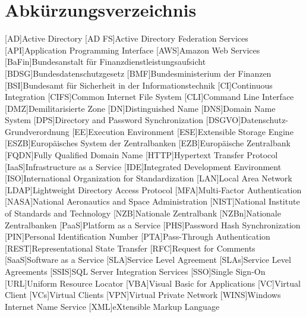 
\chapter{Abkürzungsverzeichnis}
\begin{acronym}[WHATWG ]
\setlength{\itemsep}{-\parsep}
[AD]{Active Directory}
[AD FS]{Active Directory Federation Services}
[API]{Application Programming Interface}
[AWS]{Amazon Web Services}
[BaFin]{Bundesanstalt für Finanzdienstleistungsaufsicht}
[BDSG]{Bundesdatenschutzgesetz}
[BMF]{Bundesministerium der Finanzen}
[BSI]{Bundesamt für Sicherheit in der Informationstechnik}
[CI]{Continuous Integration}
[CIFS]{Common Internet File System}
[CLI]{Command Line Interface}
[DMZ]{Demilitarisierte Zone}
[DN]{Distinguished Name}
[DNS]{Domain Name System}
[DPS]{Directory and Password Synchronization}
[DSGVO]{Datenschutz-Grundverordnung}
[EE]{Execution Environment}
[ESE]{Extensible Storage Engine}
[ESZB]{Europäisches System der Zentralbanken}
[EZB]{Europäische Zentralbank}
[FQDN]{Fully Qualified Domain Name}
[HTTP]{Hypertext Transfer Protocol}
[IaaS]{Infrastructure as a Service}
[IDE]{Integrated Development Environment}
[ISO]{International Organization for Standardization}
[LAN]{Local Area Network}
[LDAP]{Lightweight Directory Access Protocol}
[MFA]{Multi-Factor Authentication}
[NASA]{National Aeronautics and Space Administration}
[NIST]{National Institute of Standards and Technology}
[NZB]{Nationale Zentralbank}
[NZBn]{Nationale Zentralbanken}
[PaaS]{Platform as a Service}
[PHS]{Password Hash Synchronization}
[PIN]{Personal Identification Number}
[PTA]{Pass-Through Authentication}
[REST]{Representational State Transfer}
[RFC]{Request for Comments}
[SaaS]{Software as a Service}
[SLA]{Service Level Agreement}
[SLAs]{Service Level Agreements}
[SSIS]{SQL Server Integration Services}
[SSO]{Single Sign-On}
[URL]{Uniform Resource Locator}
[VBA]{Visual Basic for Applications}
[VC]{Virtual Client}
[VCs]{Virtual Clients}
[VPN]{Virtual Private Network}
[WINS]{Windows Internet Name Service}
[XML]{eXtensible Markup Language}
\end{acronym}